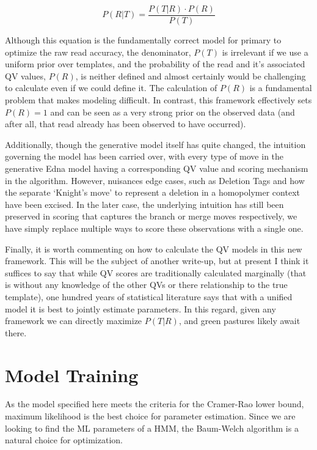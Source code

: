 \documentclass[fleqn,10pt]{SelfArx} %
\begin{document}
\begin{dmath}
P(R|T) = \frac{P(T|R) \cdot P(R)}{P(T)}
\end{dmath}

Although this equation is the fundamentally correct model for primary to optimize the raw read accuracy, the denominator, $P(T)$ is irrelevant if we use a uniform prior over templates, and the probability of the read and it's associated QV values, $P(R)$, is neither defined and almost certainly would be challenging to calculate even if we could define it.  The calculation of $P(R)$ is a fundamental problem that makes modeling difficult.  In contrast, this framework effectively sets $P(R) = 1$ and can be seen as a very strong prior on the observed data (and after all, that read already has been observed to have occurred).  

  Additionally, though the generative model itself has quite changed, the intuition governing the model has been carried over, with every type of move in the generative Edna model having a corresponding QV value and scoring mechanism in the algorithm.  However, nuisances edge cases, such as Deletion Tags and how the separate  `Knight's move' to represent a deletion in a homopolymer context have been excised.   In the later case, the underlying intuition has still been preserved in scoring that captures the branch or merge moves respectively, we have simply replace multiple ways to score these observations with a single one.

Finally, it is worth commenting on how to calculate the QV models in this new framework.  This will be the subject of another write-up, but at present I think it suffices to say that while QV scores are traditionally calculated marginally (that is without any knowledge of the other QVs or there relationship to the true template), one hundred years of statistical literature says that with a unified model it is best to jointly estimate parameters.  In this regard, given any framework we can directly maximize $P(T|R)$, and green pastures likely await there.

\section{Model Training}

As the model specified here meets the criteria for the Cramer-Rao lower bound, maximum likelihood is the best choice for parameter estimation.  Since we are looking to find the ML parameters of a HMM, the Baum-Welch algorithm is a natural choice for optimization.
\end{document}
